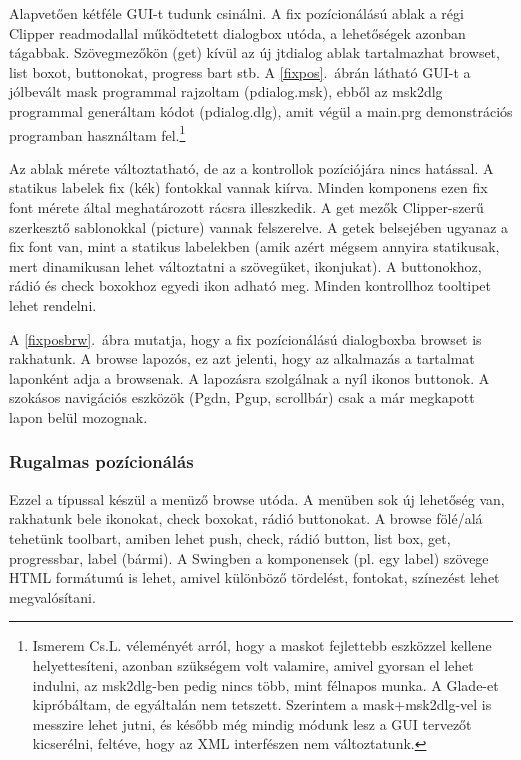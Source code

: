 Alapvetően kétféle GUI-t tudunk csinálni.
A fix pozícionálású ablak a
régi Clipper readmodallal működtetett
dialogbox utóda, a lehetőségek azonban tágabbak.
Szövegmezőkön (get) kívül az új jtdialog ablak tartalmazhat browset, 
list boxot, buttonokat, progress bart stb. 
A \ref{fixpos}.~ábrán látható GUI-t a jólbevált mask
programmal rajzoltam (pdialog.msk), ebből az msk2dlg programmal
generáltam kódot (pdialog.dlg), amit végül a main.prg demonstrációs
programban használtam fel.\footnote{
  Ismerem Cs.L. véleményét  arról, hogy a maskot
  fejlettebb eszközzel kellene helyettesíteni, azonban
  szükségem volt valamire, amivel gyorsan el lehet indulni,
  az msk2dlg-ben pedig nincs több, mint félnapos munka.
  A Glade-et kipróbáltam, de egyáltalán nem tetszett. 
  Szerintem a mask+msk2dlg-vel is messzire lehet jutni, 
  és később még mindig módunk lesz a GUI tervezőt kicserélni, 
  feltéve, hogy az XML interfészen  nem változtatunk.
}
 



Az ablak mérete változtatható, de az a kontrollok pozíciójára
nincs hatással. A statikus labelek fix (kék) fontokkal vannak
kiírva. Minden komponens ezen fix font mérete által meghatározott
rácsra illeszkedik.
A get mezők Clipper-szerű szerkesztő sablonokkal (picture) vannak felszerelve.
A getek belsejében ugyanaz a fix font van, mint a statikus 
labelekben (amik azért mégsem annyira statikusak, mert
dinamikusan lehet változtatni a szövegüket, ikonjukat).
A buttonokhoz, rádió és check boxokhoz egyedi ikon adható meg.
Minden kontrollhoz tooltipet lehet rendelni.
 
 
A \ref{fixposbrw}.~ábra mutatja, hogy a fix pozícionálású
dialogboxba browset is rakhatunk.
A browse lapozós, ez azt jelenti, hogy  az alkalmazás a tartalmat 
laponként adja a browsenak. A lapozásra szolgálnak a nyíl ikonos buttonok.
A szokásos navigációs eszközök (Pgdn, Pgup, scrollbár)  csak
a már megkapott lapon belül mozognak.
 

\subsubsection{Rugalmas pozícionálás}

Ezzel a típussal készül a menüző browse utóda. 
A menüben sok új lehetőség van, 
rakhatunk bele ikonokat, check boxokat, rádió buttonokat.
A browse fölé/alá tehetünk toolbart, amiben lehet
push, check, rádió button, list box, get, progressbar, label (bármi).
A Swingben a komponensek (pl. egy label) szövege HTML
formátumú is lehet, amivel különböző tördelést, fontokat, 
színezést lehet megvalósítani.

